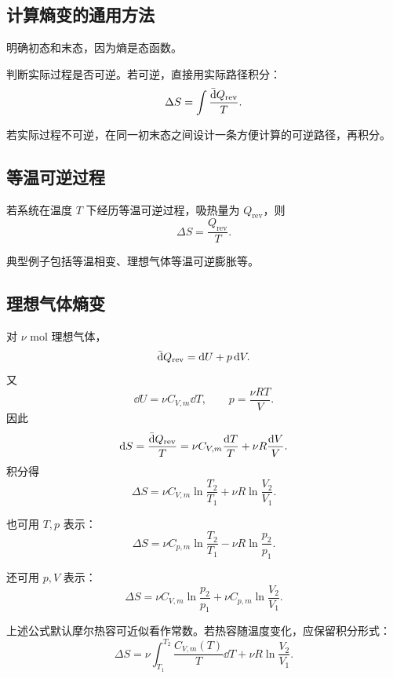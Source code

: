 \subsection{计算熵变的通用方法}

\begin{MethodBox}[熵变计算三步法]
\begin{ReviewList}
  \item 明确初态和末态，因为熵是态函数。
  \item 判断实际过程是否可逆。若可逆，直接用实际路径积分：
  \[
    \Delta S=\int\frac{\mathop{}\!\bar{\mathrm{d}} Q_{\mathrm{rev}}}{T}.
  \]
  \item 若实际过程不可逆，在同一初末态之间设计一条方便计算的可逆路径，再积分。
\end{ReviewList}
\end{MethodBox}

\subsection{等温可逆过程}

若系统在温度 \(T\) 下经历等温可逆过程，吸热量为 \(Q_{\mathrm{rev}}\)，则
\[
  \boxed{
  \Delta S=\frac{Q_{\mathrm{rev}}}{T}
  }.
\]

典型例子包括等温相变、理想气体等温可逆膨胀等。

\subsection{理想气体熵变}

对 \(\nu\) mol 理想气体，
\[
  \mathop{}\!\bar{\mathrm{d}} Q_{\mathrm{rev}}=\mathop{}\!\mathrm{d} U+p\mathop{}\!\mathrm{d} V.
\]
又
\[
  \dd U=\nu C_{V,m}\dd T,
  \qquad
  p=\frac{\nu RT}{V}.
\]
因此
\[
  \mathop{}\!\mathrm{d} S
  =
  \frac{\mathop{}\!\bar{\mathrm{d}} Q_{\mathrm{rev}}}{T}
  =
  \nu C_{V,m}\frac{\mathop{}\!\mathrm{d} T}{T}
  +
  \nu R\frac{\mathop{}\!\mathrm{d} V}{V}.
\]
积分得
\[
  \boxed{
  \Delta S
  =
  \nu C_{V,m}\ln\frac{T_2}{T_1}
  +
  \nu R\ln\frac{V_2}{V_1}
  }.
\]

也可用 \(T,p\) 表示：
\[
  \boxed{
  \Delta S
  =
  \nu C_{p,m}\ln\frac{T_2}{T_1}
  -
  \nu R\ln\frac{p_2}{p_1}
  }.
\]

还可用 \(p,V\) 表示：
\[
  \boxed{
  \Delta S
  =
  \nu C_{V,m}\ln\frac{p_2}{p_1}
  +
  \nu C_{p,m}\ln\frac{V_2}{V_1}
  }.
\]

\begin{WarnBox}[理想气体熵变公式的适用条件]
上述公式默认摩尔热容可近似看作常数。若热容随温度变化，应保留积分形式：
\[
  \Delta S
  =
  \nu\int_{T_1}^{T_2}\frac{C_{V,m}(T)}{T}\dd T
  +
  \nu R\ln\frac{V_2}{V_1}.
\]
\end{WarnBox}

